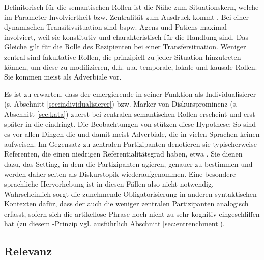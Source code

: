 Definitorisch für die semantischen Rollen  ist die Nähe zum Situationskern, welche im Parameter Involviertheit bzw. Zentralität zum Ausdruck kommt \parencite[6]{Lehmann2004a}. Bei einer dynamischen Transitivsituation  sind bspw. Agens  und Patiens maximal involviert, weil sie konstitutiv und charakteristisch für die Handlung sind. Das Gleiche gilt für die Rolle des Rezipienten bei einer Transfersituation. Weniger zentral sind fakultative Rollen, die prinzipiell zu jeder Situation hinzutreten können, um diese zu modifizieren, d.h. u.a. temporale, lokale und kausale Rollen. Sie kommen  meist als Adverbiale  vor.

Es ist zu erwarten, dass der emergierende  in seiner Funktion als Individualisierer  (s. Abschnitt \ref{sec:individualisierer}) bzw. Marker von Diskursprominenz (s. Abschnitt \ref{sec:kata}) zuerst bei zentralen semantischen Rollen  erscheint und erst später in die  eindringt. Die Beobachtungen von \textcite{Himmelmann1998} stützen diese Hypothese: So sind es vor allen Dingen die  \parencite[116]{Himmelmann1998} und damit meist  Adverbiale, die in vielen Sprachen keinen  aufweisen. Im Gegensatz zu zentralen Partizipanten  denotieren sie typischerweise Referenten, die einen niedrigen Referentialitätsgrad  haben, etwa .  Sie dienen dazu, das Setting, in dem die Partizipanten agieren, genauer zu bestimmen \parencite["-="- orientierende Funktion, s.][118]{Himmelmann1997} und werden daher selten als Diskurstopik    wiederaufgenommen. Eine besondere sprachliche Hervorhebung ist in diesen Fällen also nicht notwendig. Wahrscheinlich sorgt die zunehmende Obligatorisierung in anderen syntaktischen Kontexten dafür, dass der  auch die weniger zentralen Partizipanten  analogisch  erfasst, sofern sich die artikellose Phrase  noch nicht zu sehr kognitiv eingeschliffen  hat (zu diesem -Prinzip vgl. ausführlich Abschnitt \ref{sec:entrenchment}). 

\subsection{Relevanz}\label{sec:relevanz}

